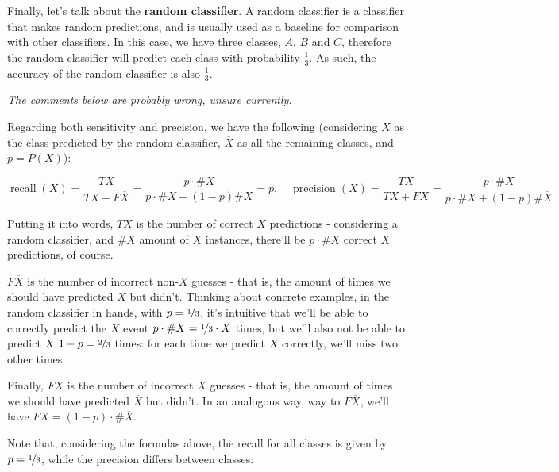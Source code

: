 \documentclass[12pt]{article}
\begin{document}
\begin{enumerate}[leftmargin=\labelsep]
        Finally, let's talk about the \textbf{random classifier}. A random classifier
        is a classifier that makes random predictions, and is usually used as a baseline
        for comparison with other classifiers. In this case, we have three classes, $A$, $B$ and $C$,
        therefore the random classifier will predict each class with probability $\frac{1}{3}$.
        As such, the accuracy of the random classifier is also $\frac{1}{3}$.

        \textit{The comments below are probably wrong, unsure currently.}


        Regarding both sensitivity and precision, we have the following (considering
        $X$ as the class predicted by the random classifier, $\overline{X}$ as all
        the remaining classes, and $p = P(X)$):

        \begin{equation*}
          \operatorname{recall}(X) = \frac{TX}{TX + F\overline{X}} = \frac{p \cdot \#X}{p \cdot \#X + (1 - p) \#X} = p, \quad
          \operatorname{precision}(X) = \frac{TX}{TX + FX} = \frac{p \cdot \#X}{p \cdot \#X + (1 - p) \#\overline{X}}
        \end{equation*}

        Putting it into words, $TX$ is the number of correct $X$ predictions - considering
        a random classifier, and $\#X$ amount of $X$ instances, there'll be $p \cdot \#X$ correct
        $X$ predictions, of course.

        $F\overline{X}$ is the number of incorrect non-$X$ guesses - that is, the
        amount of times we should have predicted $X$ but didn't. Thinking about concrete
        examples, in the random classifier in hands, with $p = \nicefrac{1}{3}$, it's
        intuitive that we'll be able to correctly predict the $X$ event $p \cdot \#X = \nicefrac{1}{3} \cdot X$
        times, but we'll also not be able to predict $X$ $1 - p = \nicefrac{2}{3}$ times:
        for each time we predict $X$ correctly, we'll miss two other times.

        Finally, $FX$ is the number of incorrect $X$ guesses - that is, the amount of
        times we should have predicted $\overline{X}$ but didn't. In an analogous way,
        way to $F\overline{X}$, we'll have $FX = (1 - p) \cdot \#\overline{X}$.

        Note that, considering the formulas above, the recall for all classes is given
        by $p = \nicefrac{1}{3}$, while the precision differs between classes:


\end{enumerate}
\end{document}
